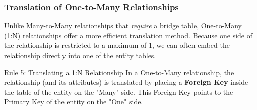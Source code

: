 \subsubsection{Translation of One-to-Many Relationships}

Unlike Many-to-Many relationships that \textit{require} a bridge table, One-to-Many (1:N) relationships offer a more efficient translation method. Because one side of the relationship is restricted to a maximum of 1, we can often embed the relationship directly into one of the entity tables.

\begin{defbox}{Rule 5: Translating a 1:N Relationship}
In a One-to-Many relationship, the relationship (and its attributes) is translated by placing a \textbf{Foreign Key} inside the table of the entity on the "Many" side. This Foreign Key points to the Primary Key of the entity on the "One" side.
\end{defbox}

